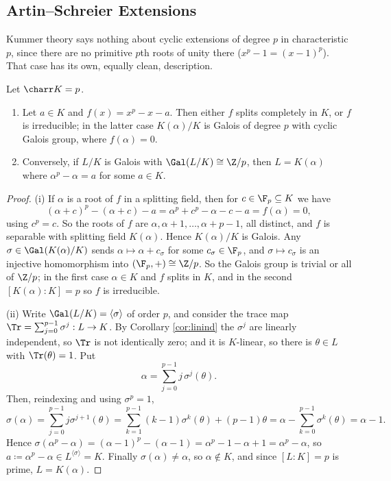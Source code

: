 \subsection{Artin--Schreier Extensions}

Kummer theory says nothing about cyclic extensions of degree $p$ in characteristic $p$, since there are no primitive $p$th roots of unity there ($x^p-1 = (x-1)^p$). That case has its own, equally clean, description.

\begin{theorem}\label{thm:artinschreier}
	Let $\charr K = p$.
	\begin{enumerate}[label=(\roman*)]
		\item Let $a \in K$ and $f(x) = x^p - x - a$. Then either $f$ splits completely in $K$, or $f$ is irreducible; in the latter case $K(\alpha)/K$ is Galois of degree $p$ with cyclic Galois group, where $f(\alpha)=0$.
		\item Conversely, if $L/K$ is Galois with $\Gal(L/K) \cong \Z/p$, then $L = K(\alpha)$ where $\alpha^p - \alpha = a$ for some $a \in K$.
	\end{enumerate}
\end{theorem}

\begin{proof}
	(i) If $\alpha$ is a root of $f$ in a splitting field, then for $c \in \F_p \subseteq K$ we have
	$$(\alpha+c)^p - (\alpha+c) - a = \alpha^p + c^p - \alpha - c - a = f(\alpha) = 0,$$
	using $c^p = c$. So the roots of $f$ are $\alpha, \alpha+1, \dots, \alpha+p-1$, all distinct, and $f$ is separable with splitting field $K(\alpha)$. Hence $K(\alpha)/K$ is Galois. Any $\sigma \in \Gal(K(\alpha)/K)$ sends $\alpha \mapsto \alpha + c_\sigma$ for some $c_\sigma \in \F_p$, and $\sigma \mapsto c_\sigma$ is an injective homomorphism into $(\F_p,+) \cong \Z/p$. So the Galois group is trivial or all of $\Z/p$; in the first case $\alpha \in K$ and $f$ splits in $K$, and in the second $[K(\alpha):K] = p$ so $f$ is irreducible.

	(ii) Write $\Gal(L/K) = \langle\sigma\rangle$ of order $p$, and consider the trace map $\Tr = \sum_{j=0}^{p-1}\sigma^j : L \to K$. By Corollary \ref{cor:linind} the $\sigma^j$ are linearly independent, so $\Tr$ is not identically zero; and it is $K$-linear, so there is $\theta \in L$ with $\Tr(\theta) = 1$. Put
	$$\alpha = \sum_{j=0}^{p-1}j\,\sigma^j(\theta).$$
	Then, reindexing and using $\sigma^p = 1$,
	$$\sigma(\alpha) = \sum_{j=0}^{p-1}j\sigma^{j+1}(\theta) = \sum_{k=1}^{p-1}(k-1)\sigma^k(\theta)+(p-1)\theta = \alpha - \sum_{k=0}^{p-1}\sigma^k(\theta) = \alpha - 1.$$
	Hence $\sigma(\alpha^p-\alpha) = (\alpha-1)^p - (\alpha-1) = \alpha^p - 1 - \alpha + 1 = \alpha^p-\alpha$, so $a \coloneqq \alpha^p - \alpha \in L^{\langle\sigma\rangle} = K$. Finally $\sigma(\alpha) \neq \alpha$, so $\alpha \notin K$, and since $[L:K] = p$ is prime, $L = K(\alpha)$.
\end{proof}

